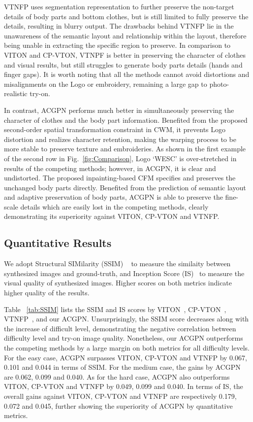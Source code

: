 \documentclass[10pt,twocolumn,letterpaper]{article}
\begin{document}
VTNFP uses segmentation representation to further preserve the non-target details of body parts and bottom clothes, but is still limited to fully preserve the details, resulting in blurry output. The drawbacks behind VTNFP lie in the unawareness of the semantic layout and relationship within the layout, therefore being unable in extracting the specific region to preserve. In comparison to VITON and CP-VTON, VTNPF is better in preserving the character of clothes and visual results, but still struggles to generate body parts details (\ie hands and finger gaps).
It is worth noting that all the methods cannot avoid distortions and misalignments on the Logo or embroidery, remaining a large gap to photo-realistic try-on.

In contrast, ACGPN performs much better in simultaneously preserving the character of clothes and the body part information. Benefited from the proposed second-order spatial transformation constraint in CWM, it prevents Logo distortion and realizes character retention, making the warping process to be more stable to preserve texture and embroideries.
As shown in the first example of the second row in Fig.~\ref{fig:Comparison}, Logo ‘WESC’ is over-stretched in results of the competing methods; however, in ACGPN, it is clear and undistorted.
The proposed inpainting-based CFM specifies and preserves the unchanged body parts directly. Benefited from the prediction of semantic layout and adaptive preservation of body parts, ACGPN is able to preserve the fine-scale details which are easily lost in the competing methods, clearly demonstrating its superiority against VITON, CP-VTON and VTNFP.




\subsection{Quantitative Results}

We adopt Structural SIMilarity (SSIM) ~\cite{wang2004image} to measure the similaity between synthesized images and ground-truth, and Inception Score (IS)~\cite{DBLP:conf/nips/SalimansGZCRCC16} to measure the visual quality of synthesized images. Higher scores on both metrics indicate higher quality of the results.


Table ~\ref{tab:SSIM} lists the SSIM and IS scores by VITON~\cite{DBLP:conf/cvpr/HanWWYD18}, CP-VTON~\cite{DBLP:conf/eccv/WangZLCLY18}, VTNFP~\cite{Yu_2019_ICCV}, and our ACGPN.
Unsurprisingly, the SSIM score decreases along with the increase of difficult level, demonstrating the negative correlation between difficulty level and try-on image quality. Nonetheless, our ACGPN outperforms the competing methods by a large margin on both metrics for all difficulty levels.
For the easy case, ACGPN surpasses VITON, CP-VTON and VTNFP by 0.067, 0.101 and 0.044 in terms of SSIM. For the medium case, the gains by ACGPN are 0.062, 0.099 and 0.040.
As for the hard case, ACGPN also outperforms VITON, CP-VTON and VTNFP by 0.049, 0.099 and 0.040.
In terms of IS, the overall gains against VITON, CP-VTON  and VTNFP are respectively 0.179, 0.072 and 0.045, further showing the superiority of ACGPN by quantitative metrics.
\end{document}
